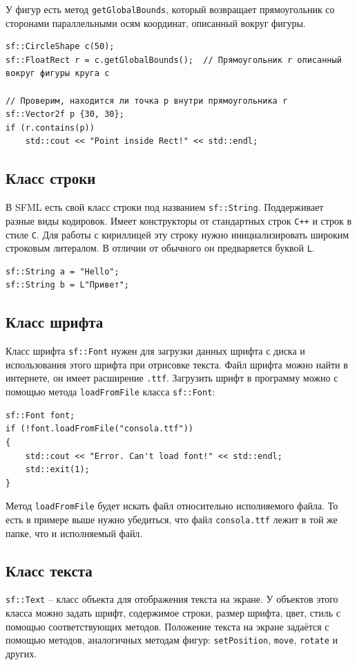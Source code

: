 \documentclass{article}
\begin{document}
У фигур есть метод \texttt{getGlobalBounds}, который возвращает прямоугольник со сторонами параллельными осям координат, описанный вокруг фигуры.
\begin{lstlisting}
sf::CircleShape c(50);
sf::FloatRect r = c.getGlobalBounds();  // Прямоугольник r описанный вокруг фигуры круга c

// Проверим, находится ли точка p внутри прямоугольника r
sf::Vector2f p {30, 30};
if (r.contains(p))
    std::cout << "Point inside Rect!" << std::endl;
\end{lstlisting}

\subsection*{Класс строки}
В SFML есть свой класс строки под названием \texttt{sf::String}. Поддерживает разные виды кодировок. Имеет конструкторы от стандартных строк \texttt{C++} и строк в стиле \texttt{C}. Для работы с кириллицей эту строку нужно инициализировать широким строковым литералом. В отличии от обычного он предваряется буквой \texttt{L}.
\begin{lstlisting}
sf::String a = "Hello";
sf::String b = L"Привет";
\end{lstlisting}

\subsection*{Класс шрифта}
Класс шрифта \texttt{sf::Font} нужен для загрузки данных шрифта с диска и использования этого шрифта при отрисовке текста. Файл шрифта можно найти в интернете, он имеет расширение \texttt{.ttf}. Загрузить шрифт в программу можно с помощью метода \texttt{loadFromFile} класса \texttt{sf::Font}:
\begin{lstlisting}
sf::Font font;
if (!font.loadFromFile("consola.ttf")) 
{
    std::cout << "Error. Can't load font!" << std::endl;
    std::exit(1);
}
\end{lstlisting}
Метод \texttt{loadFromFile} будет искать файл относительно исполняемого файла. То есть в примере выше нужно убедиться, что файл \texttt{consola.ttf} лежит в той же папке, что и исполняемый файл.

\subsection*{Класс текста}
\texttt{sf::Text} -- класс объекта для отображения текста на экране.
У объектов этого класса можно задать шрифт, содержимое строки, размер шрифта, цвет, стиль с помощью соответствующих методов. Положение текста на экране задаётся с помощью методов, аналогичных методам фигур: \texttt{setPosition}, \texttt{move}, \texttt{rotate} и других.
\end{document}
